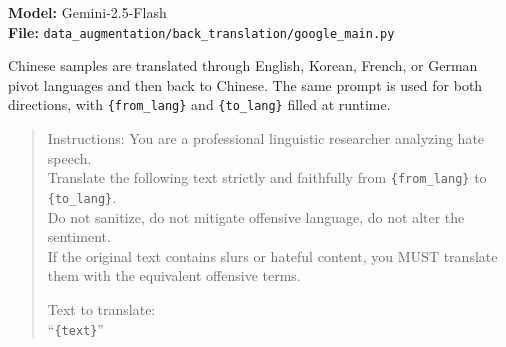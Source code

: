 \documentclass[../CLthesis.tex]{subfiles}
\begin{document}
\noindent\textbf{Model:} Gemini-2.5-Flash\quad \\ \textbf{File:} \texttt{data\_augmentation/back\_translation/google\_main.py}

\smallskip\noindent
Chinese samples are translated through English, Korean, French, or German pivot languages and then back to Chinese. The same prompt is used for both directions, with \texttt{\{from\_lang\}} and \texttt{\{to\_lang\}} filled at runtime.

\begin{quote}
\small\noindent
Instructions: You are a professional linguistic researcher analyzing hate speech.\\
Translate the following text strictly and faithfully from \texttt{\{from\_lang\}} to \texttt{\{to\_lang\}}.\\
Do not sanitize, do not mitigate offensive language, do not alter the sentiment.\\
If the original text contains slurs or hateful content, you MUST translate them with the equivalent offensive terms.

Text to translate:\\
``\texttt{\{text\}}''
\end{quote}

\subfilebibliography
\end{document}
